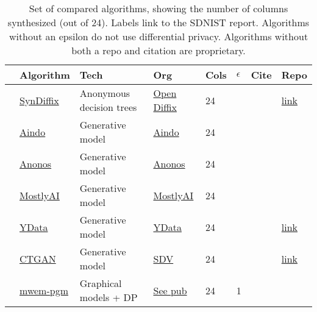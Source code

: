 \begin{table}
    \centering
    \caption{Set of compared algorithms, showing the number of columns synthesized (out of 24). Labels link to the SDNIST report. Algorithms without an epsilon do not use differential privacy. Algorithms without both a repo and citation are proprietary.}
    \label{tab:infotable}
    \begin{tabular}{llllllll}
        \toprule
          & Algorithm & Tech & Org & Cols & \thinspace$\epsilon$\qquad\qquad & Cite & Repo \\
        \midrule
        \cellcolor{blue} & \href{https://htmlpreview.github.io/?https://github.com/yoid2000/sdnist-summary/blob/main/results/syndiffix_all/report.html}{SynDiffix} & Anonymous decision trees & \href{https://www.open-diffix.org/}{Open Diffix} & 24 &  & \cite{francis2023syndiffix} & \href{https://github.com/diffix/syndiffix}{link} \\
        \cellcolor{red} & \href{https://htmlpreview.github.io/?https://github.com/yoid2000/sdnist-summary/blob/main/results/aindo_synth/report.html}{Aindo} & Generative model & \href{https://www.aindo.com/}{Aindo} & 24 &  &  &  \\
        \cellcolor{red} & \href{https://htmlpreview.github.io/?https://github.com/yoid2000/sdnist-summary/blob/main/results/anonos_sdk/report.html}{Anonos} & Generative model & \href{https://www.anonos.com/}{Anonos} & 24 &  &  &  \\
        \cellcolor{red} & \href{https://htmlpreview.github.io/?https://github.com/yoid2000/sdnist-summary/blob/main/results/mostlyai_sd_platform/report.html}{MostlyAI} & Generative model & \href{https://mostly.ai/}{MostlyAI} & 24 &  &  &  \\
        \cellcolor{red} & \href{https://htmlpreview.github.io/?https://github.com/yoid2000/sdnist-summary/blob/main/results/ydata_fabric_synthesizers/report.html}{YData} & Generative model & \href{https://ydata.ai/}{YData} & 24 &  &  & \href{https://github.com/ydataai/ydata-synthetic}{link} \\
        \cellcolor{red} & \href{https://htmlpreview.github.io/?https://github.com/yoid2000/sdnist-summary/blob/main/results/sdv_ctgan_epochs1000/report.html}{CTGAN} & Generative model & \href{https://sdv.dev/}{SDV} & 24 &  & \cite{xu2019modeling} & \href{https://github.com/sdv-dev/SDV}{link} \\
        \cellcolor{ForestGreen} & \href{https://htmlpreview.github.io/?https://github.com/yoid2000/sdnist-summary/blob/main/results/mwem_pgm/report.html}{mwem-pgm} & Graphical models + DP & \href{https://dream.cs.umass.edu/}{See pub} & 24 & 1 & \cite{mckenna2019graphical} &  \\

\end{tabular}
\end{table}
